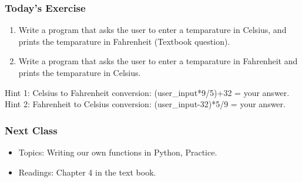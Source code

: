 \documentclass{beamer}
\begin{document}
\begin{frame}
\frametitle{Today's Exercise}
\begin{enumerate}
\item Write a program that asks the user to enter a temparature in Celsius, and prints the temparature in Fahrenheit (Textbook question). 
\item Write a program that asks the user to enter a temparature in Fahrenheit and prints the temparature in Celsius.
\end{enumerate}
\medskip
Hint 1: Celsius to Fahrenheit conversion: (user\_input*9/5)+32 = your answer.
\\ Hint 2: Fahrenheit to Celsius conversion: (user\_input-32)*5/9 = your answer.
\end{frame}

\begin{frame}
\frametitle{Next Class}
\begin{itemize}
\item Topics: Writing our own functions in Python, Practice. 
\item Readings: Chapter 4 in the text book.
\end{itemize}
\end{frame}
\end{document}
